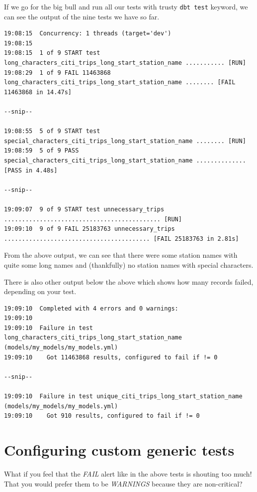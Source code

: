 \documentclass[
]{book}
\begin{document}
If we go for the big bull and run all our tests with trusty \texttt{dbt\ test} keyword, we can see the output of the nine tests we have so far.

\begin{verbatim}
19:08:15  Concurrency: 1 threads (target='dev')
19:08:15  
19:08:15  1 of 9 START test long_characters_citi_trips_long_start_station_name ........... [RUN]
19:08:29  1 of 9 FAIL 11463868 long_characters_citi_trips_long_start_station_name ........ [FAIL 11463868 in 14.47s]

--snip--

19:08:55  5 of 9 START test special_characters_citi_trips_long_start_station_name ........ [RUN]
19:08:59  5 of 9 PASS special_characters_citi_trips_long_start_station_name .............. [PASS in 4.48s]

--snip--

19:09:07  9 of 9 START test unnecessary_trips ............................................ [RUN]
19:09:10  9 of 9 FAIL 25183763 unnecessary_trips ......................................... [FAIL 25183763 in 2.81s]
\end{verbatim}

From the above output, we can see that there were some station names with quite some long names and (thankfully) no station names with special characters.

There is also other output below the above which shows how many records failed, depending on your test.

\begin{verbatim}
19:09:10  Completed with 4 errors and 0 warnings:
19:09:10  
19:09:10  Failure in test long_characters_citi_trips_long_start_station_name (models/my_models/my_models.yml)
19:09:10    Got 11463868 results, configured to fail if != 0
 
--snip--

19:09:10  Failure in test unique_citi_trips_long_start_station_name (models/my_models/my_models.yml)
19:09:10    Got 910 results, configured to fail if != 0
\end{verbatim}

\hypertarget{configuring-custom-generic-tests}{%
\section{Configuring custom generic tests}\label{configuring-custom-generic-tests}}

What if you feel that the \emph{FAIL} alert like in the above tests is shouting too much! That you would prefer them to be \emph{WARNINGS} because they are non-critical?
\end{document}
